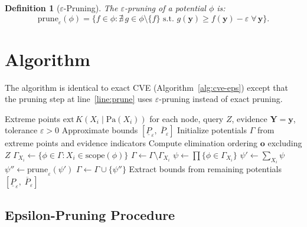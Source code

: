 \documentclass[11pt]{article}
\newtheorem{definition}{Definition}
\begin{document}
\begin{definition}[$\varepsilon$-Pruning]
The $\varepsilon$-pruning of a potential $\phi$ is:
\[
  \mathrm{prune}_\varepsilon(\phi) = \{f \in \phi : \nexists\, g \in \phi \setminus \{f\}
  \text{ s.t.\ } g(\mathbf{y}) \geq f(\mathbf{y}) - \varepsilon\; \forall\, \mathbf{y}\}.
\]
\end{definition}

\section{Algorithm}

The algorithm is identical to exact CVE (Algorithm~\ref{alg:cve-eps}) except that
the pruning step at line~\ref{line:prune} uses $\varepsilon$-pruning instead of
exact pruning.

\begin{algorithm}[H]
\caption{Epsilon-Approximate Credal Variable Elimination}
\label{alg:cve-eps}
\begin{algorithmic}[1]
\Require Extreme points $\mathrm{ext}\,K(X_i \mid \mathrm{Pa}(X_i))$ for each node,
         query $Z$, evidence $\mathbf{Y} = \mathbf{y}$, tolerance $\varepsilon > 0$
\Ensure Approximate bounds $[\underline{P}_\varepsilon,\; \overline{P}_\varepsilon]$
\Statex
\State Initialize potentials $\Gamma$ from extreme points and evidence indicators
\State Compute elimination ordering $\mathbf{o}$ excluding $Z$
  \State $\Gamma_{X_i} \gets \{\phi \in \Gamma : X_i \in \mathrm{scope}(\phi)\}$
  \State $\Gamma \gets \Gamma \setminus \Gamma_{X_i}$
  \State $\psi \gets \prod \{\phi \in \Gamma_{X_i}\}$
  \State $\psi' \gets \sum_{X_i} \psi$
  \State $\psi'' \gets \mathrm{prune}_\varepsilon(\psi')$
  \label{line:prune}
  \State $\Gamma \gets \Gamma \cup \{\psi''\}$
\EndFor
\State Extract bounds from remaining potentials
\State \Return $[\underline{P}_\varepsilon,\; \overline{P}_\varepsilon]$
\end{algorithmic}
\end{algorithm}

\subsection{Epsilon-Pruning Procedure}
\end{document}
